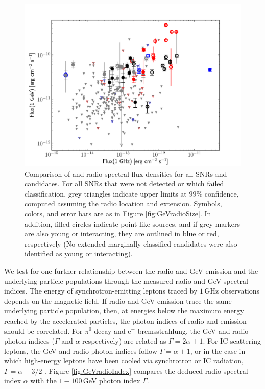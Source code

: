 \begin{figure}[h!]
	\centering
	\includegraphics[width=1.\columnwidth]{figures/radio_vs_gamma_nuFnu_flux_ULs.pdf}
	\caption[Comparison of \gam{} and radio spectral flux densities for all SNRs and candidates.]{Comparison of \gam{} and radio spectral flux densities for all SNRs and candidates. For all SNRs that were not detected or which failed classification, grey triangles indicate upper limits at $99\%$ confidence, computed assuming the radio location and extension. Symbols, colors, and error bars are as in Figure \ref{fig:GeVradioSize}. In addition, filled circles indicate point-like sources, and if grey markers are also young or interacting, they are outlined in blue or red, respectively (No extended marginally classified candidates were also identified as young or interacting).
	}
	\label{fig:GeVradioFlux}
\end{figure}

We test for one further relationship between the radio and GeV emission and the underlying particle populations through the measured radio and GeV spectral indices. The energy of synchrotron-emitting leptons traced by $1$\,GHz observations depends on the magnetic field. If radio and GeV emission trace the same underlying particle population, then, at energies below the maximum energy reached by the accelerated particles, the photon indices of radio and \gam{} emission should be correlated. For $\pi^0$ decay and e$^\pm$ bremsstrahlung, the GeV and radio photon indices ($\Gamma$ and $\alpha$ respectively) are related as $\Gamma = 2\alpha + 1$. For IC scattering leptons, the GeV and radio photon indices follow $\Gamma = \alpha + 1$, or in the case in which high-energy leptons have been cooled via synchrotron or IC radiation, $\Gamma = \alpha + 3/2$ \citep{Reynolds08}. Figure \ref{fig:GeVradioIndex} compares the deduced radio spectral index $\alpha$ with the $1-100$\,GeV photon index $\Gamma$. 

